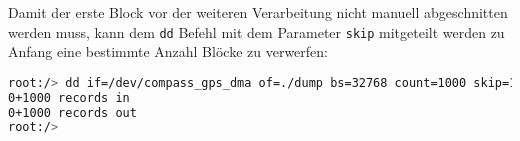 Damit der erste Block vor der weiteren Verarbeitung nicht manuell abgeschnitten werden muss, kann dem \lstinline$dd$ Befehl mit dem Parameter \lstinline$skip$ mitgeteilt werden zu Anfang eine bestimmte Anzahl Blöcke zu verwerfen:

\begin{lstlisting}[language=bash, deletekeywords={if}]
root:/> dd if=/dev/compass_gps_dma of=./dump bs=32768 count=1000 skip=10
0+1000 records in
0+1000 records out
root:/> 
\end{lstlisting}
